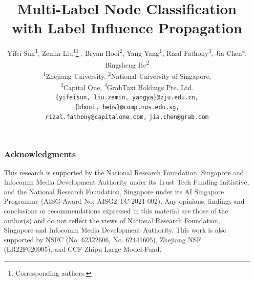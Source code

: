 \documentclass{article} %
\title{Multi-Label Node Classification with Label Influence Propagation}
\author{Yifei Sun\textsuperscript{\rm 1}, 
Zemin Liu\textsuperscript{\rm 1}\thanks{Corresponding authors.} ,
Bryan Hooi\textsuperscript{\rm 2},
Yang Yang\textsuperscript{\rm 1}\footnotemark[1] ,
Rizal Fathony\textsuperscript{\rm 3},
Jia Chen\textsuperscript{\rm 4},
Bingsheng He\textsuperscript{\rm 2}\footnotemark[1]\\
\textsuperscript{\rm 1}Zhejiang University, 
\textsuperscript{\rm 2}National University of Singapore,\\
\textsuperscript{\rm 3}Capital One,
\textsuperscript{\rm 4}GrabTaxi Holdings Pte. Ltd.\\
\texttt{\{yifeisun, liu.zemin, yangya\}@zju.edu.cn,}\\
\texttt{\{bhooi, hebs\}@comp.nus.edu.sg,}\\
\texttt{rizal.fathony@capitalone.com,}
\texttt{jia.chen@grab.com}
}
\begin{document}
\maketitle









\newpage

\subsubsection*{Acknowledgments}
This research is supported by the National Research Foundation, Singapore and Infocomm Media Development Authority under its Trust Tech Funding Initiative, and the National Research Foundation, Singapore under its AI Singapore Programme (AISG Award No: AISG2-TC-2021-002). Any opinions, findings and conclusions or recommendations expressed in this material are those of the author(s) and do not reflect the views of National Research Foundation, Singapore and Infocomm Media Development Authority. This work is also supported by NSFC (No. 62322606, No. 62441605), Zhejiang NSF (LR22F020005), and CCF-Zhipu Large Model Fund.





\newpage

\appendix

\end{document}

